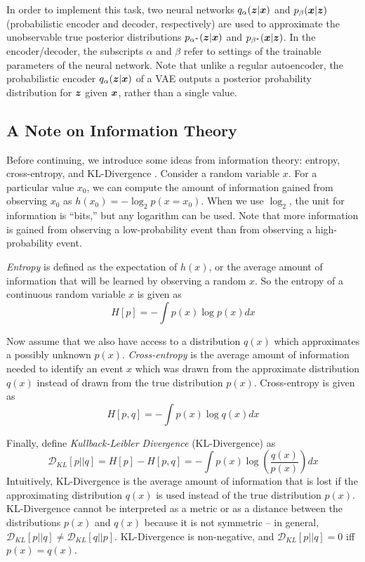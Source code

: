 In order to implement this task, two neural networks $q_\alpha(\boldsymbol{z} | \boldsymbol{x})$ and $p_\beta(\boldsymbol{x} | \boldsymbol{z})$ (probabilistic encoder and decoder, respectively) are used to approximate the unobservable true posterior distributions $p_{\alpha^*}(\boldsymbol{z}| \boldsymbol{x})$ and $p_{\beta^*}(\boldsymbol{x} | \boldsymbol{z})$. In the encoder/decoder, the subscripts $\alpha$ and $\beta$ refer to settings of the trainable parameters of the neural network. Note that unlike a regular autoencoder, the probabilistic encoder $q_\alpha(\boldsymbol{z} | \boldsymbol{x})$ of a VAE outputs a posterior probability distribution for $\boldsymbol{z}$ given $\boldsymbol{x}$, rather than a single value.

\subsection{A Note on Information Theory}
Before continuing, we introduce some ideas from information theory: entropy, cross-entropy, and KL-Divergence \cite{pattern_rec_book}. Consider a random variable $x$. For a particular value $x_0$, we can compute the amount of information gained from observing $x_0$ as $h(x_0) = -\log_2 p(x=x_0)$. When we use $\log_2$, the unit for information is ``bits,'' but any logarithm can be used. Note that more information is gained from observing a low-probability event than from observing a high-probability event. 

\textit{Entropy} is defined as the expectation of $h(x)$, or the average amount of information that will be learned by observing a random $x$. So the entropy of a continuous random variable $x$ is given as 
\begin{equation}
  H[p] = - \int p(x) \log p(x)dx
  \label{eq:entropy}
\end{equation}

Now assume that we also have access to a distribution $q(x)$ which approximates a possibly unknown $p(x)$. \textit{Cross-entropy} is the average amount of information needed to identify an event $x$ which was drawn from the approximate distribution $q(x)$ instead of drawn from the true distribution $p(x)$. Cross-entropy is given as
\begin{equation}
  H[p,q] = - \int p(x) \log q(x) dx
  \label{eq:xentropy}
\end{equation}

Finally, define \textit{Kullback-Leibler Divergence} (KL-Divergence) \cite{kullback1951} as 
\begin{equation}
  \mathcal{D}_{KL}\left[ p || q \right] = H[p] - H[p,q] = - \int p(x) \log \left(\frac{q(x)}{p(x)} \right)dx
  \label{eq:kl_div}
\end{equation}
Intuitively, KL-Divergence is the average amount of information that is lost if the approximating distribution $q(x)$ is used instead of the true distribution $p(x)$. KL-Divergence cannot be interpreted as a metric or as a distance between the distributions $p(x)$ and $q(x)$ because it is not symmetric -- in general, $\mathcal{D}_{KL}[p||q] \not = \mathcal{D}_{KL}[q||p]$. KL-Divergence is non-negative, and $\mathcal{D}_{KL}[p||q] = 0$ iff $p(x) = q(x)$.

